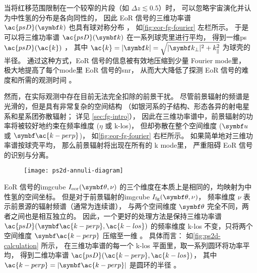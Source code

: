 当将红移范围限制在一个较窄的片段（如 $\Delta z \lesssim 0.5$）时，
可以忽略宇宙演化并认为中性氢的分布是各向同性的，
因此 EoR 信号的三维功率谱 $\ac{psD}(\B{k})$ 也具有球对称分布
\cite{morales2004,mcQuinn2006}，
如\autoref{fig:eor-fg-fourier} 左栏所示。
于是可以将三维功率谱 $\ac{psD}(\B{k})$ 在一系列球壳里进行平均，
得到一维\ac{ps} $\ac{psD}(\ac{k})$ \cite{morales2004,datta2010}，
其中 $\ac{k} = |\B{k}| = \sqrt{|\B{k}_{\perp}|^2 + k_{\parallel}^2}$
为球壳的半径。
通过这种方式，EoR 信号的信息被有效地压缩到少量 Fourier \ac{mode}里，
极大地提高了每个\ac{mode}里 EoR 信号的\ac{snr}，
从而大大降低了探测 EoR 信号的难度和所需的观测时间 \cite{datta2010}。

然而，在实际观测中存在目前无法完全扣除的前景干扰。
尽管前景辐射的频谱是光滑的，但是具有非常复杂的空间结构
（如银河系的子结构、形态各异的射电星系和星系团弥散辐射；
详见 \autoref{sec:fg-intro}），
因此在三维功率谱中，前景辐射的功率将被较好地约束在频率维度
($\eta$ 或 \ac{k-los})，
但却弥散在整个空间维度 ($\B{u}$ 或 $\B{\ac{k-perp}}$)，
如\autoref{fig:eor-fg-fourier} 右栏所示。
如果简单地对三维功率谱按球壳平均，
那么前景辐射将出现在所有的 \ac{k} \ac{mode}里，
严重阻碍 EoR 信号的识别与分离。

\begin{figure}[htp]
  \centering
  \texttt{[image: ps2d-annuli-diagram]}
  \label{fig:ps2d-calculation}
\end{figure}

EoR 信号的\ac{imgcube} $I_{\R{eor}}(\B{\theta}, \nu)$
的三个维度在本质上是相同的，均映射为中性氢的空间坐标。
但是对于前景辐射的\ac{imgcube} $I_{\R{fg}}(\B{\theta}, \nu)$，
频率维度 $\nu$ 表示前景源的辐射频谱（通常为连续谱），
与两个空间维度 $\B{\theta}$ 完全不同，两者之间也是相互独立的。
因此，一个更好的处理方法是保持三维功率谱 $\ac{psD}(\B{\ac{k-perp}}, \ac{k-los})$
的频率维度 \ac{k-los} 不变，只将两个空间维度 $\B{\ac{k-perp}}$ 压缩至一维
\cite{datta2010}。
具体而言：
如\autoref{fig:ps2d-calculation} 所示，
在三维功率谱的每一个 \ac{k-los} 平面里，取一系列圆环将功率平均，
得到二维功率谱 $\ac{psD}(\ac{k-perp}, \ac{k-los})$，
其中 $\ac{k-perp} = |\B{\ac{k-perp}}|$ 是圆环的半径
\cite{thyagarajan2013}。

